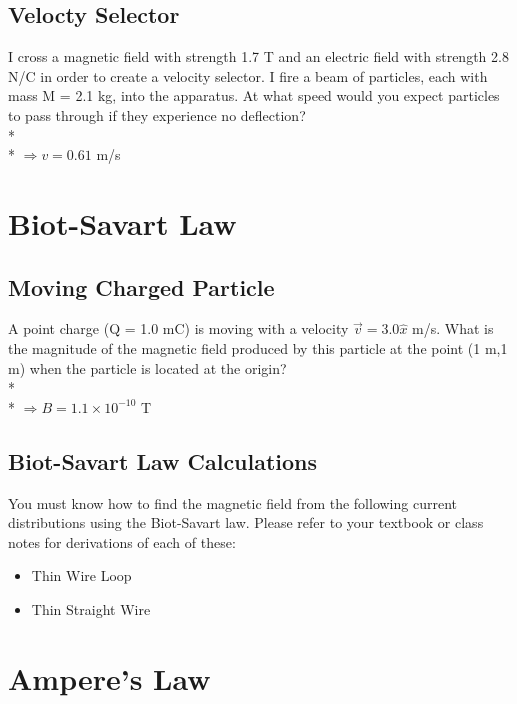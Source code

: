 \documentclass[11pt]{article}
\begin{document}
\subsection{Velocty Selector}
I cross a magnetic field with strength 1.7 T and an electric field with strength 2.8 N/C in order to create a velocity selector.  I fire a beam of particles, each with mass M = 2.1 kg, into the apparatus.  At what speed would you expect particles to pass through if they experience no deflection? \\* \\*
$\Rightarrow v = 0.61$ m/s



\pagebreak
\section{Biot-Savart Law}
\vspace{10pt}

\subsection{Moving Charged Particle}
A point charge (Q = 1.0 mC) is moving with a velocity $\vec{v} = 3.0 \hat{x}$ m/s.  What is the magnitude of the magnetic field produced by this particle at the point (1 m,1 m) when the particle is located at the origin? \\* \\*
$\Rightarrow B = 1.1 \times 10^{-10}$ T

\subsection{Biot-Savart Law Calculations}
You must know how to find the magnetic field from the following current distributions using the Biot-Savart law.  Please refer to your textbook or class notes for derivations of each of these:

\begin{itemize}
\item Thin Wire Loop
\item Thin Straight Wire
\end{itemize}


\pagebreak
\section{Ampere's Law}
\vspace{10pt}
\end{document}
